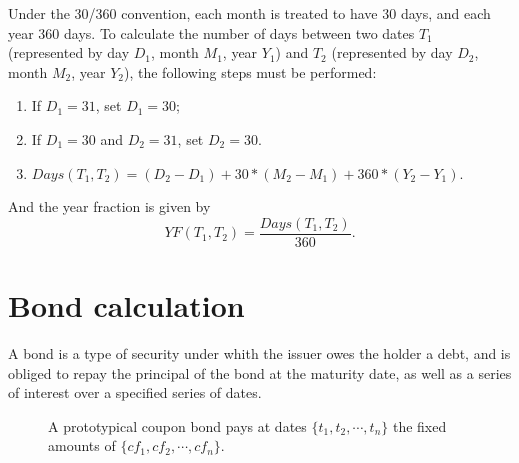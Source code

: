 Under the 30/360 convention, each month is treated to have 30 days, and each
year 360 days. To calculate the number of days between two dates $T_1$
(represented by day $D_1$, month $M_1$, year $Y_1$) and $T_2$
(represented by day $D_2$, month $M_2$, year $Y_2$), the following steps must be
performed:

\begin{enumerate}
  \item If $D_1=31$, set $D_1=30$;
  \item If $D_1=30$ and $D_2=31$, set $D_2=30$.
  \item $Days(T_1,T_2) = (D_2 - D_1) + 30 * (M_2 - M_1) + 360 * (Y_2 - Y_1)$.
\end{enumerate}

And the year fraction is given by
\begin{equation}
  YF(T_1,T_2) = \frac{Days(T_1,T_2)}{360}.
\end{equation}


\section{Bond calculation}

A bond is a type of security under whith the issuer owes the holder a debt, and
is obliged to repay the principal of the bond at the maturity date, as well as a
series of interest over a specified series of dates.



\begin{figure}
  \caption{A prototypical coupon bond pays at dates
           $\{t_1,t_2,\cdots,t_{n}\}$ the fixed amounts of 
           $\{cf_1,cf_2,\cdots,cf_n\}$.}
\end{figure}

